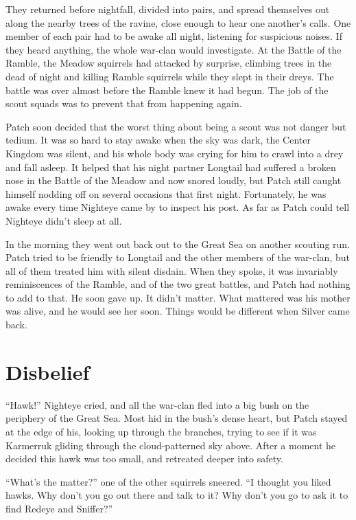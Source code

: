 \documentclass[ebook,oneside,openany,12pt]{memoir}
\begin{document}
They returned before nightfall, divided into pairs, and spread
themselves out along the nearby trees of the ravine, close enough to
hear one another’s calls. One member of each pair had to be awake all
night, listening for suspicious noises. If they heard anything, the
whole war-clan would investigate. At the Battle of the Ramble, the
Meadow squirrels had attacked by surprise, climbing trees in the dead
of night and killing Ramble squirrels while they slept in their
dreys. The battle was over almost before the Ramble knew it had
begun. The job of the scout squads was to prevent that from happening
again.

Patch soon decided that the worst thing about being a scout was not
danger but tedium. It was so hard to stay awake when the sky was dark,
the Center Kingdom was silent, and his whole body was crying for him
to crawl into a drey and fall asleep. It helped that his night partner
Longtail had suffered a broken nose in the Battle of the Meadow and
now snored loudly, but Patch still caught himself nodding off on
several occasions that first night. Fortunately, he was awake every
time Nighteye came by to inspect his post. As far as Patch could tell
Nighteye didn’t sleep at all.

In the morning they went out back out to the Great Sea on another
scouting run. Patch tried to be friendly to Longtail and the other
members of the war-clan, but all of them treated him with silent
disdain. When they spoke, it was invariably reminiscences of the
Ramble, and of the two great battles, and Patch had nothing to add to
that. He soon gave up. It didn’t matter. What mattered was his mother
was alive, and he would see her soon. Things would be different when
Silver came back.


\section{Disbelief}

“Hawk!” Nighteye cried, and all the war-clan fled into a big bush on
the periphery of the Great Sea. Most hid in the bush’s dense heart,
but Patch stayed at the edge of his, looking up through the branches,
trying to see if it was Karmerruk gliding through the cloud-patterned
sky above. After a moment he decided this hawk was too small, and
retreated deeper into safety.

“What’s the matter?” one of the other squirrels sneered. “I thought
you liked hawks. Why don’t you go out there and talk to it? Why don’t
you go to ask it to find Redeye and Sniffer?”
\end{document}
